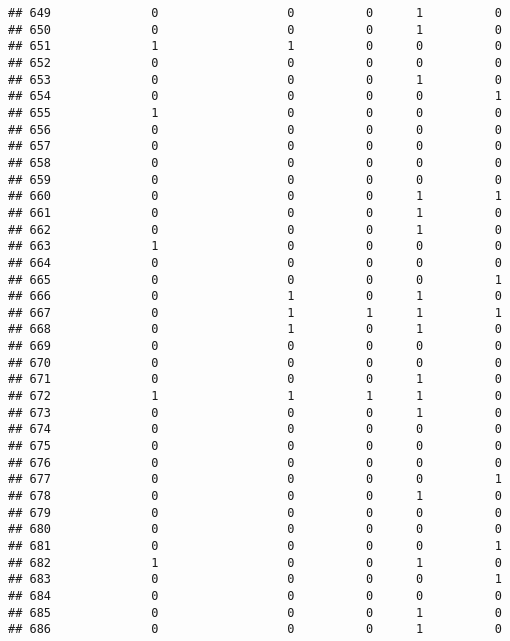 \documentclass[
]{article}
\begin{document}
\begin{verbatim}
## 649              0                  0          0      1          0
## 650              0                  0          0      1          0
## 651              1                  1          0      0          0
## 652              0                  0          0      0          0
## 653              0                  0          0      1          0
## 654              0                  0          0      0          1
## 655              1                  0          0      0          0
## 656              0                  0          0      0          0
## 657              0                  0          0      0          0
## 658              0                  0          0      0          0
## 659              0                  0          0      0          0
## 660              0                  0          0      1          1
## 661              0                  0          0      1          0
## 662              0                  0          0      1          0
## 663              1                  0          0      0          0
## 664              0                  0          0      0          0
## 665              0                  0          0      0          1
## 666              0                  1          0      1          0
## 667              0                  1          1      1          1
## 668              0                  1          0      1          0
## 669              0                  0          0      0          0
## 670              0                  0          0      0          0
## 671              0                  0          0      1          0
## 672              1                  1          1      1          0
## 673              0                  0          0      1          0
## 674              0                  0          0      0          0
## 675              0                  0          0      0          0
## 676              0                  0          0      0          0
## 677              0                  0          0      0          1
## 678              0                  0          0      1          0
## 679              0                  0          0      0          0
## 680              0                  0          0      0          0
## 681              0                  0          0      0          1
## 682              1                  0          0      1          0
## 683              0                  0          0      0          1
## 684              0                  0          0      0          0
## 685              0                  0          0      1          0
## 686              0                  0          0      1          0

\end{verbatim}
\end{document}
